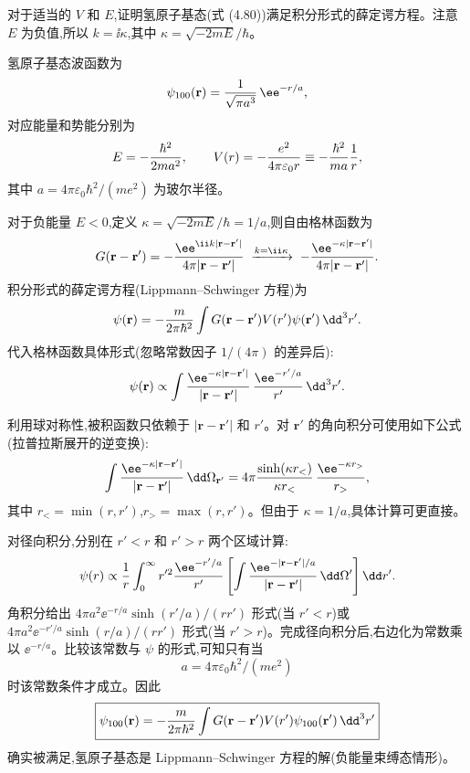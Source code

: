 \begin{question}
对于适当的 $V$ 和 $E$,证明氢原子基态(式 (4.80))满足积分形式的薛定谔方程。注意 $E$ 为负值,所以 $k=\ii\kappa$,其中 $\kappa=\sqrt{-2mE}/\hbar$。

\par\smallskip
{}

\end{question}
\begin{solution}
氢原子基态波函数为
\[
\psi_{100}(\mathbf r)={1\over\sqrt{\pi a^{3}}}\,\ee^{-r/a},
\]
对应能量和势能分别为
\[
E=-{\hbar^2\over2ma^2},\qquad
V(r)=-{e^2\over4\pi\varepsilon_0 r}\equiv-{\hbar^2\over m a}{1\over r},
\]
其中 $a=4\pi\varepsilon_0\hbar^2/(me^2)$ 为玻尔半径。

对于负能量 $E<0$,定义 $\kappa=\sqrt{-2mE}/\hbar=1/a$,则自由格林函数为
\[
G(\mathbf r-\mathbf r')=-{\ee^{\ii k|\mathbf r-\mathbf r'|}\over4\pi|\mathbf r-\mathbf r'|}
\;\xrightarrow{k=\ii\kappa}\;
-{\ee^{-\kappa|\mathbf r-\mathbf r'|}\over4\pi|\mathbf r-\mathbf r'|}.
\]
积分形式的薛定谔方程(Lippmann--Schwinger 方程)为
\[
\psi(\mathbf r)=-{m\over2\pi\hbar^2}\int G(\mathbf r-\mathbf r')V(r')\psi(\mathbf r')\,\dd^3r'.
\]
代入格林函数具体形式(忽略常数因子 $1/(4\pi)$ 的差异后):
\[
\psi(\mathbf r)\propto\int{\ee^{-\kappa|\mathbf r-\mathbf r'|}\over|\mathbf r-\mathbf r'|}\,{\ee^{-r'/a}\over r'}\,\dd^3r'.
\]

利用球对称性,被积函数只依赖于 $|\mathbf r-\mathbf r'|$ 和 $r'$。对 $\mathbf r'$ 的角向积分可使用如下公式(拉普拉斯展开的逆变换):
\[
\int {\ee^{-\kappa|\mathbf r-\mathbf r'|}\over|\mathbf r-\mathbf r'|}\,\dd\Omega_{\mathbf r'}
=4\pi{\sinh(\kappa r_<)\over\kappa r_<}\,{\ee^{-\kappa r_>}\over r_>},
\]
其中 $r_<=\min(r,r')$,$r_>=\max(r,r')$。但由于 $\kappa=1/a$,具体计算可更直接。

对径向积分,分别在 $r'<r$ 和 $r'>r$ 两个区域计算:
\[
\psi(r)\propto{1\over r}\int_0^\infty r'^2{\ee^{-r'/a}\over r'}\left[\int {\ee^{-|\mathbf r-\mathbf r'|/a}\over|\mathbf r-\mathbf r'|}\,\dd\Omega'\right]\dd r'.
\]
角积分给出 $4\pi a^2 \ee^{-r/a}\sinh(r'/a)/(rr')$ 形式(当 $r'<r$)或 $4\pi a^2 \ee^{-r'/a}\sinh(r/a)/(rr')$ 形式(当 $r'>r$)。完成径向积分后,右边化为常数乘以 $\ee^{-r/a}$。比较该常数与 $\psi$ 的形式,可知只有当
\[
a=4\pi\varepsilon_0\hbar^2/(me^2)
\]
时该常数条件才成立。因此
\[
\boxed{\psi_{100}(\mathbf r)=-{m\over2\pi\hbar^2}\int G(\mathbf r-\mathbf r')V(r')\psi_{100}(\mathbf r')\,\dd^3r'}
\]
确实被满足,氢原子基态是 Lippmann--Schwinger 方程的解(负能量束缚态情形)。
\end{solution}

